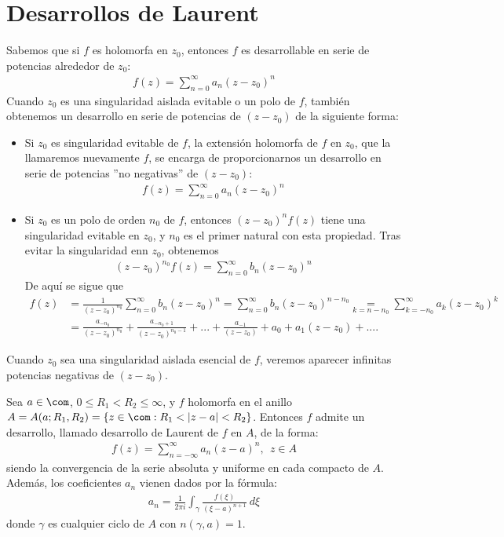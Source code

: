 \section{Desarrollos de Laurent}
Sabemos que si $f$ es holomorfa en $z_0$, entonces $f$ es desarrollable en serie de potencias alrededor de $z_0$:
\begin{align*}
    f(z) = \sum_{n=0}^{\infty}{a_n(z-z_0)^n}
\end{align*}
Cuando $z_0$ es una singularidad aislada evitable o un polo de $f$, también obtenemos un desarrollo en serie de potencias de $(z-z_0)$ de la siguiente forma:
\begin{itemize}
    \item Si $z_0$ es singularidad evitable de $f$, la extensión holomorfa de $f$ en $z_0$, que la llamaremos nuevamente $f$, se encarga de proporcionarnos un desarrollo en serie de potencias ''no negativas'' de $(z-z_0)$:
    \begin{align*}
        f(z) = \sum_{n=0}^{\infty}{a_n(z-z_0)^n}
    \end{align*}
    \item Si $z_0$ es un polo de orden $n_0$ de $f$, entonces $(z-z_0)^nf(z)$ tiene una singularidad evitable en $z_0$, y $n_0$ es el primer natural con esta propiedad. Tras evitar la singularidad enn $z_0$, obtenemos
    \begin{align*}
        (z-z_0)^{n_0}f(z) = \sum_{n=0}^{\infty}{b_n(z-z_0)^n}
    \end{align*}
    De aquí se sigue que
    \begin{align*}
        f(z) &= \frac{1}{(z-z_0)^{n_0}}\sum_{n=0}^{\infty}{b_n(z-z_0)^n} = \sum_{n=0}^{\infty}{b_n(z-z_0)^{n-n_0}} \underset{k = n-n_0}{=} \sum_{k=-n_0}^{\infty}{a_k(z-z_0)^k} \\
        &= \frac{a_{-n_0}}{(z-z_0)^{n_0}} + \frac{a_{-n_0 +1}}{(z-z_0)^{n_0-1}} + ... + \frac{a_{-1}}{(z-z_0)} + a_0 + a_1(z-z_0)+ ....
    \end{align*}
\end{itemize}
Cuando $z_0$ sea una singularidad aislada esencial de $f$, veremos aparecer infinitas potencias negativas de $(z-z_0)$.

\begin{teo}
Sea $a \in \com$, $0 \leq R_1 < R_2 \leq \infty$, y $f$ holomorfa en el anillo $A = A(a;R_1,R_2) = \{ z \in \com : R_1 < |z-a| < R_2\}$. Entonces $f$ admite un desarrollo, llamado desarrollo de Laurent de $f$ en $A$, de la forma:
\begin{align*}
    f(z) = \sum_{n = -\infty}^{\infty}{a_n(z-a)^n}, \ \ z \in A
\end{align*}
siendo la convergencia de la serie absoluta y uniforme en cada compacto de $A$. Además, los coeficientes $a_n$ vienen dados por la fórmula:
\begin{align*}
    a_n = \frac{1}{2\pi i} \int_{\gamma} {\frac{f(\xi)}{(\xi -a)^{n+1}} \ d \xi}
\end{align*}
donde $\gamma$ es cualquier ciclo de $A$ con $n(\gamma,a) = 1$.
\end{teo}

